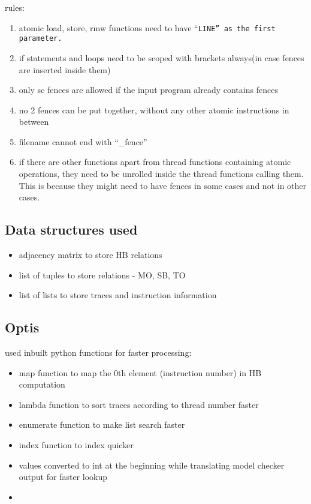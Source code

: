 rules:
\begin{enumerate}
	\item atomic load, store, rmw functions need to have ``\tt{\textunderscore\textunderscore LINE\textunderscore\textunderscore}'' as the first parameter.
	\item if statements and loops need to be scoped with brackets always(in case fences are inserted inside them)
	\item only sc fences are allowed if the input program already contains fences
	\item no 2 fences can be put together, without any other atomic instructions in between
	\item filename cannot end with ``\_fence''
	\item if there are other functions apart from thread functions containing atomic operations, they need to be unrolled inside the thread functions calling them. This is because they might need to have fences in some cases and not in other cases.
\end{enumerate}

\subsection{Data structures used}
\begin{itemize}
	\item adjacency matrix to store HB relations
	\item list of tuples to store relations - MO, SB, TO
	\item list of lists to store traces and instruction information
\end{itemize}

\subsection{Optis}
used inbuilt python functions for faster processing:
\begin{itemize}
	\item map function to map the 0th element (instruction number) in HB computation
	\item lambda function to sort traces according to thread number faster
	\item enumerate function to make list search faster
	\item index function to index quicker
	\item values converted to int at the beginning while translating model checker output for faster lookup
	\item 
\end{itemize}

